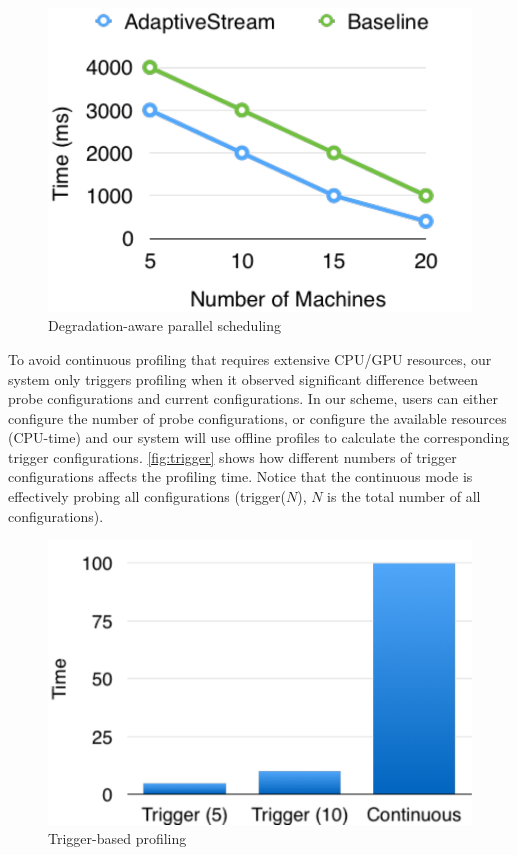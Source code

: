 \begin{figure}
  \centering
  \includegraphics[width=\columnwidth]{figures/parallel-placeholder.pdf}
  \caption{Degradation-aware parallel scheduling}
  \label{fig:parallel}
\end{figure}

 To avoid continuous profiling that requires
extensive CPU/GPU resources, our system only triggers profiling when it observed
significant difference between probe configurations and current
configurations. In our scheme, users can either configure the number of probe
configurations, or configure the available resources (CPU-time) and our system
will use offline profiles to calculate the corresponding trigger configurations.
\autoref{fig:trigger} shows how different numbers of trigger configurations
affects the profiling time. Notice that the continuous mode is effectively
probing all configurations (trigger($N$), $N$ is the total number of all
configurations).

\begin{figure}
  \centering
  \includegraphics[width=\columnwidth]{figures/trigger.pdf}
  \caption{Trigger-based profiling}
  \label{fig:trigger}
\end{figure}

